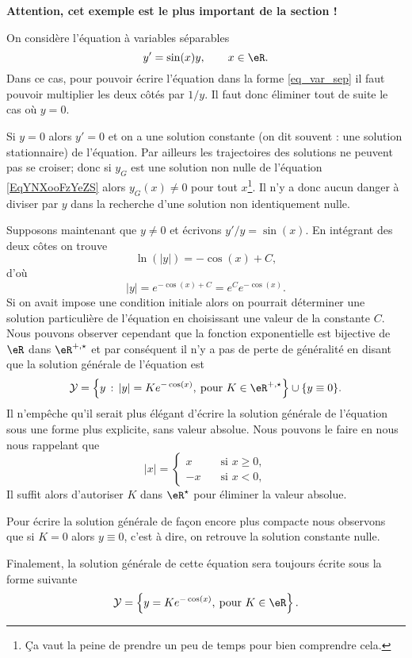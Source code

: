 \begin{example}\label{exemple_eq_hom}
  \textbf{Attention, cet exemple est le plus important de la section !}

On considère l'équation à variables séparables
\begin{equation}    \label{EqYNXooFzYeZS}
  y' = \sin(x) y , \qquad x\in\eR.
\end{equation}
Dans ce cas, pour pouvoir écrire l'équation dans la forme \eqref{eq_var_sep} il faut pouvoir multiplier les deux c\^otés par $1/y$. Il faut donc éliminer tout de suite le cas o\`u $y = 0$.

Si $y= 0$ alors $y' =0$ et on a une solution constante (on dit souvent : une solution stationnaire) de l'équation. Par ailleurs les trajectoires des solutions ne peuvent pas se croiser; donc si \( y_G\) est une solution non nulle de l'équation \eqref{EqYNXooFzYeZS} alors \( y_G(x)\neq 0\) pour tout \( x\)\footnote{Ça vaut la peine de prendre un peu de temps pour bien comprendre cela.}. Il n'y a donc aucun danger à diviser par \( y\) dans la recherche d'une solution non identiquement nulle.

Supposons maintenant que $y\neq 0$ et écrivons $y'/y = \sin(x)$. En intégrant des deux côtes on trouve
\[
  \ln(|y|) =- \cos(x) +C,
\]
d'où
\[
|y| = e^{- \cos(x) +C}= e^{C}e^{- \cos(x)}.
\]
Si on avait impose une condition initiale alors on pourrait déterminer une solution particulière de l'équation en choisissant une valeur de la constante $C$. Nous pouvons observer cependant que la fonction exponentielle est bijective de $\eR$ dans $\eR^{+,\star}$ et par conséquent il n'y a pas de perte de généralité en disant que la solution générale de l'équation est
\begin{equation*}
  \mathcal{Y} = \left\{ y \,:\, |y| = Ke^{- \cos(x)}, \:\text{pour } K\in\eR^{+,\star}\right\}\cup\{y\equiv 0\}.
\end{equation*}
Il n'empêche qu'il serait plus élégant d'écrire la solution générale de l'équation sous une forme plus explicite, sans valeur absolue. Nous pouvons le faire en nous nous rappelant que
\begin{equation*}
 |x| =  \begin{cases}
    x & \quad\text{si } x \geq 0 ,\\
    -x & \quad\text{si } x <0 ,
  \end{cases}
\end{equation*}
Il suffit alors d'autoriser $K$ dans $\eR^{\star}$ pour éliminer la valeur absolue.

Pour écrire la solution générale de façon encore plus compacte nous observons que si $K=0$ alors $y \equiv 0$, c'est \`a dire, on retrouve la solution constante nulle.

Finalement, la solution générale de cette équation sera toujours écrite sous la forme suivante
\begin{equation}
  \mathcal{Y} = \left\{ y = Ke^{- \cos(x)}, \:\text{pour } K\in\eR\right\}.
\end{equation}
\end{example}

